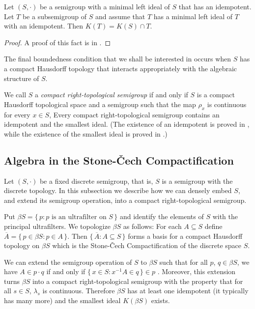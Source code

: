 \begin{thm}
  \label{thm:smallest-subsemigrp}
  Let $(S, \cdot)$ be a semigroup with a minimal left ideal of $S$ that has an idempotent. 
  Let $T$ be a subsemigroup of $S$ and assume that $T$ has a minimal left ideal of $T$ with an idempotent.
  Then $K(T) = K(S) \cap T$.
\end{thm}
\begin{proof}
  A proof of this fact is in \cite[Theorem 1.65]{Hindman:1998fk}.
\end{proof}

The final boundedness condition that we shall be interested in occurs when $S$ has a compact Hausdorff topology that interacts appropriately with the algebraic structure of $S$.

We call $S$ a \emph{compact right-topological semigroup} if and only if $S$ is a compact Hausdorff topological space and a semigroup such that the map $\rho_x$ is continuous for every $x \in S$,
Every compact right-topological semigroup contains an idempotent and the smallest ideal.
(The existence of an idempotent is proved in \cite[Theorem 2.5]{Hindman:1998fk}, while the existence of the smallest ideal is proved in \cite[Theorem 2.8]{Hindman:1998fk}.)

\subsection{Algebra in the Stone-\v{C}ech Compactification}
Let $(S, \cdot)$ be a fixed discrete semigroup, that is, $S$ is a semigroup with the discrete topology. 
In this subsection we describe how we can densely embed $S$, and extend its semigroup operation, into a compact right-topological semigroup.

Put $\beta S = \{\, p : \mbox{$p$ is an ultrafilter on $S$} \,\}$ and identify the elements of $S$ with the principal ultrafilters.
We topologize $\beta S$ as follows: For each $A \subseteq S$ define $\overline{A} = \{\, p \in \beta S : p \in A \,\}$.
Then $\{\, \overline{A} : A \subseteq S \,\}$ forms a basis for a compact Hausdorff topology on $\beta S$ which is the Stone-\v{C}ech Compactification \cite[Theorem 3.27]{Hindman:1998fk} of the discrete space $S$.

We can extend the semigroup operation of $S$ to $\beta S$ \cite[Theorem 4.1]{Hindman:1998fk} such that for all $p$, $q \in \beta S$, we have $A \in p \cdot q$ if and only if $\{\, x \in S : x^{-1}A \in q \,\} \in p$ \cite[Theorem 4.12(b)]{Hindman:1998fk}.
Moreover, this extension turns $\beta S$ into a compact right-topological semigroup with the property that for all $s \in S$, $\lambda_s$ is continuous. 
Therefore $\beta S$ has at least one idempotent (it typically has many more) and the smallest ideal $K(\beta S)$ exists. 

